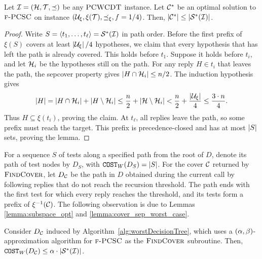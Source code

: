 \begin{lemma}\label{lemma:cover_sep_worst_case}
    Let $\mathcal{I}=\mathopen{}\left( \mathcal{H}, \mathcal{T}, \preceq \right)$ be any $\textup{\textsc{PCWCDT}}$ instance.
    Let $\mathcal{C}^*$ be an optimal solution to $\textup{\textsc{f-PCSC}}$ on instance $\mathopen{}\left( \mathcal{U}_{\xi}, \xi(\mathcal{T}), \preceq_{\xi}, f=1/4 \right)$.
    Then, $\mathopen{}\left| \mathcal{C}^* \right| \leq \mathopen{}\left| \mathcal{S}^*\mathopen{}\left( \mathcal{I} \right) \right|$.
\end{lemma}
\begin{proof}
    Write $S=\mathopen{}\langle t_1,\ldots,t_\ell \rangle=\mathcal{S}^*\mathopen{}\left( \mathcal{I} \right)$ in path order. Before the first prefix of $\xi(S)$ covers at least $\mathopen{}\left| \mathcal{U}_{\xi} \right|/4$ hypotheses, we claim that every hypothesis that has left the path is already covered. This holds before $t_1$. Suppose it holds before $t_i$, and let $\mathcal{H}_i$ be the hypotheses still on the path. For any reply $H\in t_i$ that leaves the path, the sepcover property gives $\mathopen{}\left| H\cap\mathcal{H}_i \right|\leq n/2$. The induction hypothesis gives
    \[
    \mathopen{}\left| H \right|=\mathopen{}\left| H\cap\mathcal{H}_i \right|+\mathopen{}\left| H\setminus\mathcal{H}_i \right|
    \leq \frac n2+\mathopen{}\left| \mathcal{H}\setminus\mathcal{H}_i \right|
    <\frac n2+\frac{\mathopen{}\left| \mathcal{U}_{\xi} \right|}{4}\leq\frac{3\cdot n}{4}.
    \]
    Thus $H\subseteq\xi(t_i)$, proving the claim. At $t_\ell$, all replies leave the path, so some prefix must reach the target. This prefix is precedence-closed and has at most $\mathopen{}\left| S \right|$ sets, proving the lemma.
\end{proof}

For a sequence $S$ of tests along a specified path from the root of $D$, denote its path of test nodes by $D_S$, with $\texttt{COST}_W\mathopen{}\left( D_S \right)=\mathopen{}\left| S \right|$. For the cover $\mathcal{C}$ returned by $\textup{\textsc{FindCover}}{}$, let $D_{\mathcal{C}}$ be the path in $D$ obtained during the current call by following replies that do not reach the recursion threshold. The path ends with the first test for which every reply reaches the threshold, and its tests form a prefix of $\xi^{-1}(\mathcal{C})$.
The following observation is due to Lemmas \ref{lemma:subspace_opt} and \ref{lemma:cover_sep_worst_case}.
    \begin{observation} \label{obs:DS}
        Consider $D_{\mathcal{C}}$ induced by Algorithm~\ref{alg:worstDecisionTree}, which uses a $\mathopen{}\left( \alpha,\beta \right)$-approximation algorithm for $\textup{\textsc{f-PCSC}}$ as the $\textup{\textsc{FindCover}}{}$ subroutine.
        Then, $\texttt{COST}_W\mathopen{}\left( D_{\mathcal{C}} \right) \leq \alpha \cdot \mathopen{}\left| \mathcal{S}^*\mathopen{}\left( \mathcal{I} \right) \right|$.
    \end{observation}


